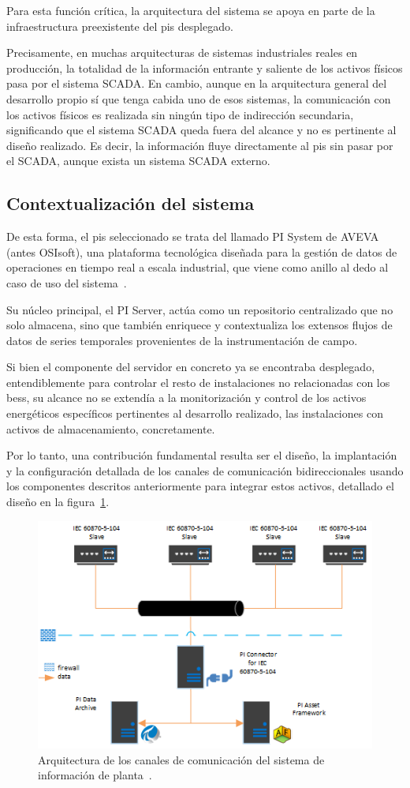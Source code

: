 Para esta función crítica, la arquitectura del sistema se apoya en parte de la infraestructura preexistente del \gls{pis} desplegado.

Precisamente, en muchas arquitecturas de sistemas industriales reales en producción, la totalidad de la información entrante y saliente de los activos físicos pasa por el sistema SCADA\@. En cambio, aunque en la arquitectura general del desarrollo propio sí que tenga cabida uno de esos sistemas, la comunicación con los activos físicos es realizada sin ningún tipo de indirección secundaria, significando que el sistema SCADA queda fuera del alcance y no es pertinente al diseño realizado. Es decir, la información fluye directamente al \gls{pis} sin pasar por el SCADA\@, aunque exista un sistema SCADA externo.

\subsection{Contextualización del sistema}
\label{makereference3.4.1}

De esta forma, el \gls{pis} seleccionado se trata del llamado PI System de AVEVA (antes OSIsoft), una plataforma tecnológica diseñada para la gestión de datos de operaciones en tiempo real a escala industrial, que viene como anillo al dedo al caso de uso del sistema~\cite{aveva2025aveva}.

Su núcleo principal, el PI Server, actúa como un repositorio centralizado que no solo almacena, sino que también enriquece y contextualiza los extensos flujos de datos de series temporales provenientes de la instrumentación de campo.

Si bien el componente del servidor en concreto ya se encontraba desplegado, entendiblemente para controlar el resto de instalaciones no relacionadas con los \gls{bess}, su alcance no se extendía a la monitorización y control de los activos energéticos específicos pertinentes al desarrollo realizado, las instalaciones con activos de almacenamiento, concretamente.

Por lo tanto, una contribución fundamental resulta ser el diseño, la implantación y la configuración detallada de los canales de comunicación bidireccionales usando los componentes descritos anteriormente para integrar estos activos, detallado el diseño en la figura~\ref{fig:sistema-de-informacion-de-planta}.

\begin{figure}
  \centering
  \includegraphics[width=0.5\linewidth]{figures/sistema-de-informacion-de-planta.png}
  \caption[Arquitectura del sistema de información de planta.]{Arquitectura de los canales de comunicación del sistema de información de planta~\cite{aveva2025aveva}.}
  \label{fig:sistema-de-informacion-de-planta}
\end{figure}

